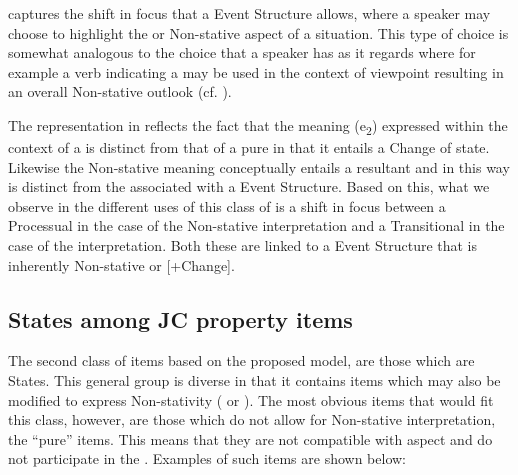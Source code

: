 \z 
{} captures the shift in focus that a  Event Structure allows, where a speaker may choose to highlight the  or Non-stative aspect of a situation. This type of choice is somewhat analogous to the choice that a speaker has as it regards  where for example a verb indicating a  may be used in the context of  viewpoint resulting in an overall Non-stative outlook (cf. \citealt{Smith1983}). 

The representation in  reflects the fact that the  meaning (e\textsubscript{2}) expressed within the context of a  is distinct from that of a pure  in that it entails a Change of state. Likewise the Non-stative meaning conceptually entails a resultant  and in this way is distinct from the  associated with a  Event Structure. Based on this, what we observe in the different uses of this class of  is a shift in focus between a Processual  in the case of the Non-stative interpretation and a Transitional  in the case of the  interpretation. Both these are linked to a  Event Structure that is inherently Non-stative or [+Change]. 


\subsection{States among JC property items}\label{sec:5.2.2}
The second class of items based on the proposed model, are those which are States. This general group is diverse in that it contains items which may also be modified to express Non-stativity ( or ). The most obvious items that would fit this class, however, are those which do not allow for Non-stative interpretation, the ``pure''  items. This means that they are not compatible with  aspect and do not participate in the . Examples of such items are shown below: 

\ea%
\label{ex:5:14}

 

